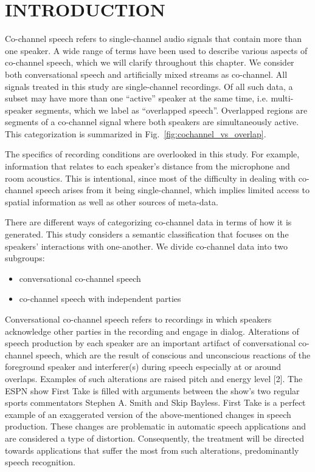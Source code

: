 
\chapter{INTRODUCTION}

Co-channel speech refers to single-channel audio signals that contain more than one speaker. 
A wide range of terms have been used to describe various aspects of co-channel speech, 
which we will clarify throughout this chapter. 
We consider both conversational speech and artificially mixed streams as co-channel. 
All signals treated in this study are single-channel recordings. 
Of all such data, a subset may have more than one ``active'' speaker at the same time, i.e. multi-speaker segments, 
which we label as ``overlapped speech''. 
Overlapped regions are segments of a co-channel signal where both speakers are simultaneously active. This categorization is summarized in Fig.~\ref{fig:cochannel_vs_overlap}.

The specifics of recording conditions are overlooked in this study. 
For example, information that relates to each speaker’s distance from the microphone and room acoustics. 
This is intentional, since most of the difficulty in dealing with co-channel speech arises 
from it being single-channel, which implies limited access to spatial 
information as well as other sources of meta-data.

There are different ways of categorizing co-channel data in terms of how it is generated. This study considers a semantic classification that focuses on the speakers' interactions with one-another. We divide co-channel data into two subgroups: 
\begin{itemize}
	\item conversational co-channel speech
	\item co-channel speech with independent parties	
\end{itemize} 

Conversational co-channel speech refers to recordings in which speakers acknowledge other parties in the recording and engage in dialog. 
Alterations of speech production by each speaker are an important artifact of conversational co-channel speech, which are the result of conscious and unconscious reactions of the foreground speaker and interferer(s) during speech especially at or around overlaps. 
Examples of such alterations are raised pitch and energy level [2]. 
The ESPN show First Take is filled with arguments between the show’s two regular sports commentators Stephen A. Smith and Skip Bayless. 
First Take is a perfect example of an exaggerated version of the above-mentioned changes in speech production. 
These changes are problematic in automatic speech applications and are considered a type of distortion. 
Consequently, the treatment will be directed towards applications that suffer the most from such alterations, predominantly speech recognition. 

